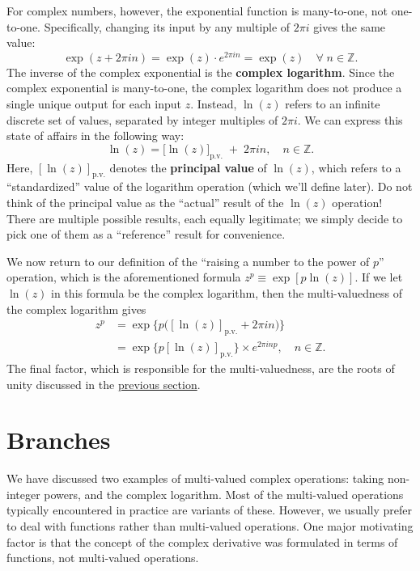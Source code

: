 \documentclass[10pt,a4paper]{article}
\begin{document}
For complex numbers, however, the exponential function is many-to-one,
not one-to-one. Specifically, changing its input by any multiple of
$2\pi i$ gives the same value:
\begin{equation}
  \exp(z + 2\pi i n) = \exp(z) \cdot e^{2\pi i n}
  = \exp(z) \quad \forall\; n \in \mathbb{Z}.
\end{equation}
The inverse of the complex exponential is the \textbf{complex
  logarithm}. Since the complex exponential is many-to-one, the
complex logarithm does not produce a single unique output for each
input $z$.  Instead, $\ln(z)$ refers to an infinite discrete set of
values, separated by integer multiples of $2\pi i$. We can express
this state of affairs in the following way:
\begin{equation}
  \ln(z) = \big[\ln(z)\big]_{\mathrm{p.v.}}\;
  +\; 2 \pi i n, \quad n \in \mathbb{Z}.
\end{equation}
Here, $[\ln(z)]_{\mathrm{p.v.}}$ denotes the \textbf{principal value}
of $\ln(z)$, which refers to a ``standardized'' value of the logarithm
operation (which we'll define later). Do not think of the principal
value as the ``actual'' result of the $\ln(z)$ operation! There are
multiple possible results, each equally legitimate; we simply decide
to pick one of them as a ``reference'' result for convenience.

We now return to our definition of the ``raising a number to the power
of $p$'' operation, which is the aforementioned formula $z^p \equiv
\exp\left[p\ln(z)\right]$. If we let $\ln(z)$ in this formula be the
complex logarithm, then the multi-valuedness of the complex logarithm
gives
\begin{align}
  z^p &= \exp\Big\{p\big([\ln(z)]_{\mathrm{p.v.}} + 2\pi i n\big)\Big\}\\
  &= \exp\Big\{p[\ln(z)]_{\mathrm{p.v.}}\Big\} \times e^{2\pi i np},
  \quad n \in \mathbb{Z}.
\end{align}
The final factor, which is responsible for the multi-valuedness, are
the roots of unity discussed in the \hyperref[roots-of-unity]{previous
  section}.

\section{Branches}\label{branches}

We have discussed two examples of multi-valued complex operations:
taking non-integer powers, and the complex logarithm. Most of the
multi-valued operations typically encountered in practice are variants
of these. However, we usually prefer to deal with functions rather
than multi-valued operations. One major motivating factor is that the
concept of the complex derivative was formulated in terms of
functions, not multi-valued operations.
\end{document}
